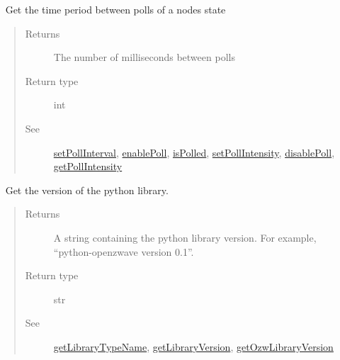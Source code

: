 \documentclass[letterpaper,10pt,english]{sphinxmanual}
\begin{document}
\begin{fulllineitems}
\begin{fulllineitems}
\end{fulllineitems}


\begin{fulllineitems}
\label{libopenzwave:libopenzwave.PyManager.getPollInterval}~\label{libopenzwave:getpollinterval}
Get the time period between polls of a nodes state
\begin{quote}\begin{description}
\item[{Returns}] \leavevmode
The number of milliseconds between polls

\item[{Return type}] \leavevmode
int

\item[{See}] \leavevmode
{\hyperref[libopenzwave:setpollinterval]{setPollInterval}}, {\hyperref[libopenzwave:enablepoll]{enablePoll}}, {\hyperref[libopenzwave:ispolled]{isPolled}}, {\hyperref[libopenzwave:setpollintensity]{setPollIntensity}}, {\hyperref[libopenzwave:disablepoll]{disablePoll}}, {\hyperref[libopenzwave:getpollintensity]{getPollIntensity}}

\end{description}\end{quote}

\end{fulllineitems}


\begin{fulllineitems}
\label{libopenzwave:libopenzwave.PyManager.getPythonLibraryVersion}~\label{libopenzwave:getpythonlibraryversion}
Get the version of the python library.
\begin{quote}\begin{description}
\item[{Returns}] \leavevmode
A string containing the python library version. For example, ``python-openzwave version 0.1''.

\item[{Return type}] \leavevmode
str

\item[{See}] \leavevmode
{\hyperref[libopenzwave:getlibrarytypename]{getLibraryTypeName}}, {\hyperref[libopenzwave:getlibraryversion]{getLibraryVersion}}, {\hyperref[libopenzwave:getozwlibraryversion]{getOzwLibraryVersion}}


\end{description}
\end{quote}
\end{fulllineitems}
\end{fulllineitems}
\end{document}
